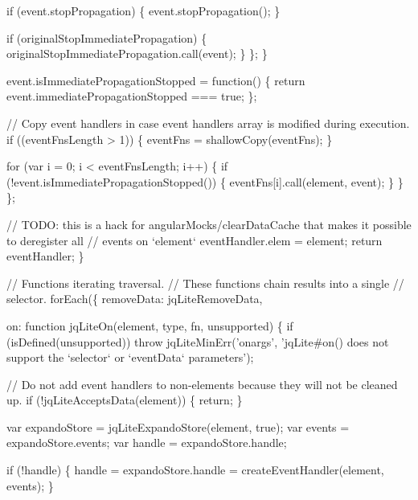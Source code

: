 \begin{DoxyCodeInclude}
{        \textcolor{keywordflow}{if} (event.stopPropagation) \{
          \textcolor{keyword}{event}.stopPropagation();
        \}

        \textcolor{keywordflow}{if} (originalStopImmediatePropagation) \{
          originalStopImmediatePropagation.call(event);
        \}
      \};
    \}

    \textcolor{keyword}{event}.isImmediatePropagationStopped = \textcolor{keyword}{function}() \{
      \textcolor{keywordflow}{return} \textcolor{keyword}{event}.immediatePropagationStopped === \textcolor{keyword}{true};
    \};

    \textcolor{comment}{// Copy event handlers in case event handlers array is modified during execution.}
    \textcolor{keywordflow}{if} ((eventFnsLength > 1)) \{
      eventFns = shallowCopy(eventFns);
    \}

    \textcolor{keywordflow}{for} (var i = 0; i < eventFnsLength; i++) \{
      \textcolor{keywordflow}{if} (!event.isImmediatePropagationStopped()) \{
        eventFns[i].call(element, event);
      \}
    \}
  \};

  \textcolor{comment}{// TODO: this is a hack for angularMocks/clearDataCache that makes it possible to deregister all}
  \textcolor{comment}{//       events on `element`}
  eventHandler.elem = element;
  \textcolor{keywordflow}{return} eventHandler;
\}

\textcolor{comment}{// Functions iterating traversal.}
\textcolor{comment}{// These functions chain results into a single}
\textcolor{comment}{// selector.}
\textcolor{comment}{}forEach(\{
  removeData: jqLiteRemoveData,

  on: \textcolor{keyword}{function} jqLiteOn(element, type, fn, unsupported) \{
    \textcolor{keywordflow}{if} (isDefined(unsupported)) \textcolor{keywordflow}{throw} jqLiteMinErr(\textcolor{stringliteral}{'onargs'}, \textcolor{stringliteral}{'jqLite#on() does not support the `selector`
       or `eventData` parameters'});

    \textcolor{comment}{// Do not add event handlers to non-elements because they will not be cleaned up.}
    \textcolor{keywordflow}{if} (!jqLiteAcceptsData(element)) \{
      \textcolor{keywordflow}{return};
    \}

    var expandoStore = jqLiteExpandoStore(element, \textcolor{keyword}{true});
    var events = expandoStore.events;
    var handle = expandoStore.handle;

    \textcolor{keywordflow}{if} (!handle) \{
      handle = expandoStore.handle = createEventHandler(element, events);
    \}

}
\end{DoxyCodeInclude}
